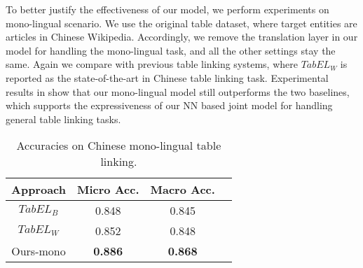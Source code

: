 
To better justify the effectiveness of our model, we perform experiments on mono-lingual scenario.
We use the original table dataset, where target entities are articles in Chinese Wikipedia.
Accordingly, we remove the translation layer in our model for handling the mono-lingual task,
and all the other settings stay the same.
Again we compare with previous table linking systems,
where \textit{$TabEL_W$} is reported as the state-of-the-art in Chinese table linking task.
Experimental results in  show that
our mono-lingual model still outperforms the two baselines,
which supports the expressiveness of our NN based joint model for handling general table linking tasks.

\begin{table}[ht]
	\small
	\centering
	\caption{Accuracies on Chinese mono-lingual table linking.}
	\label{tab:mono-result}
	\begin{tabular} {c|c|cc}
        \hline
		Approach          & Micro Acc.   & Macro Acc.    \\
		\hline
		$TabEL_B$         &  0.848       & 0.845         \\
		$TabEL_W$         &  0.852       & 0.848         \\     
		Ours-mono  &  \textbf{0.886}       & \textbf{0.868}   \\
        \hline
	\end{tabular}
\end{table}
